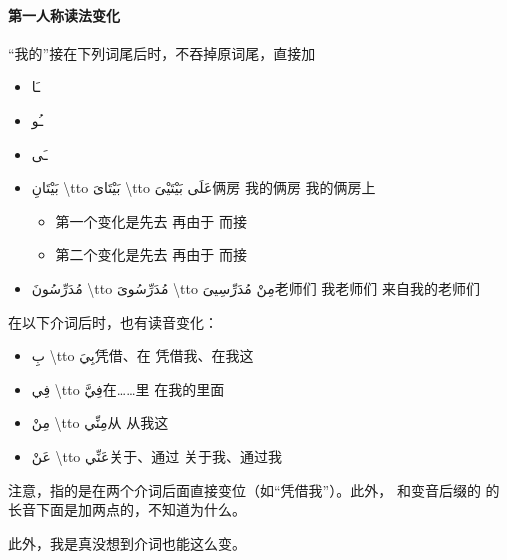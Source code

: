 \paragraph{第一人称读法变化} ``我的''接在下列词尾后时，不吞掉原词尾，直接加 

\begin{Arabic}
    \begin{itemize}
        \item ـَا
        \item ـُو
        \item ـَى
    \end{itemize}
\end{Arabic}

\begin{itemize}
    \item \ac{بَيْتَانِ \tto بَيْتَاىَ \tto عَلَى بَيْتَيْىَ}{俩房 \tto 我的俩房 \tto 我的俩房上}
    \begin{itemize}
        \item 第一个变化是先去  再由于  而接 
        \item 第二个变化是先去  再由于  而接 
    \end{itemize}
    \item \ac{مُدَرِّسُونَ \tto مُدَرِّسُوىَ \tto مِنْ مُدَرِّسِيىَ}{老师们 \tto 我老师们  \tto 来自我的老师们 \\}
\end{itemize}


在以下介词后时，也有读音变化：

\begin{itemize}
    \item \ac{بِ \tto بِيَ}{凭借、在 \tto 凭借我、在我这}
    \item \ac{فِي \tto فِيَّ}{在……里 \tto 在我的里面}
    \item \ac{مِنْ \tto مِنِّي}{从 \tto 从我这}
    \item \ac{عَنْ \tto عَنِّي}{关于、通过 \tto 关于我、通过我}
\end{itemize}

\begin{note}
    注意，指的是在两个介词后面直接变位（如``凭借我''）。此外， 和变音后缀的  的长音下面是加两点的，不知道为什么。

    此外，我是真没想到介词也能这么变。
\end{note}